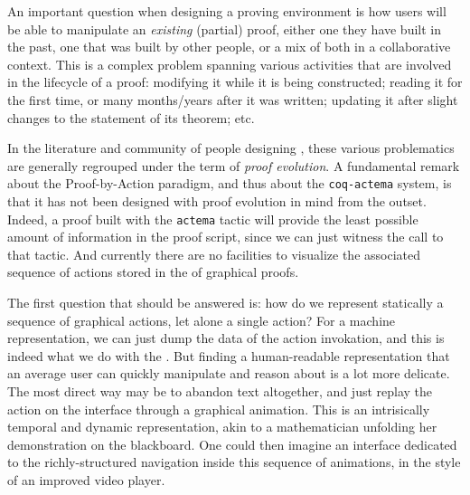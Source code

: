 An important question when designing a proving environment is how users will be
able to manipulate an \emph{existing} (partial) proof, either one they have
built in the past, one that was built by other people, or a mix of both in a
collaborative context. This is a complex problem spanning various activities
that are involved in the lifecycle of a proof: modifying it while it is being
constructed; reading it for the first time, or many months/years after it was
written; updating it after slight changes to the statement of its theorem;
etc.

In the literature and community of people designing , these
various problematics are generally regrouped under the term of \emph{proof
evolution}. A fundamental remark about the Proof-by-Action paradigm, and thus
about the \texttt{coq-actema} system, is that it has not been designed with
proof evolution in mind from the outset. Indeed, a proof built with the
\texttt{actema} tactic will provide the least possible amount of information in
the proof script, since we can just witness the call to that tactic. And
currently there are no facilities to visualize the associated sequence of
actions stored in the  of graphical proofs.

The first question that should be answered is: how do we represent statically a
sequence of graphical actions, let alone a single action? For a machine
representation, we can just dump the data of the action invokation, and this is
indeed what we do with the . But finding a human-readable
representation that an average user can quickly manipulate and reason about is a
lot more delicate. The most direct way may be to abandon text altogether, and
just replay the action on the interface through a graphical animation. This is
an intrisically temporal and dynamic representation, akin to a mathematician
unfolding her demonstration on the blackboard. One could then imagine an
interface dedicated to the richly-structured navigation inside this sequence of
animations, in the style of an improved video player.

